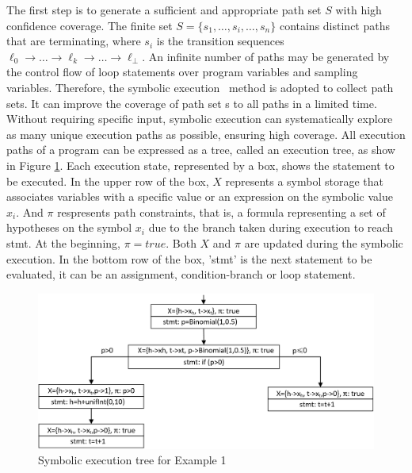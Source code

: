 \documentclass[runningheads]{llncs}
\begin{document}
The first step is to generate a sufficient and appropriate path set $S$ with high confidence coverage. The finite set $S=\{s_1,\dots,s_i,\dots,s_n\}$ contains distinct paths that are terminating, where $s_i$ is the transition sequences $\ell_0 \to \dots \to \ell_k \to \dots \to \ell_{\bot}$. An infinite number of paths may be generated by the control flow of loop statements over program variables and sampling variables. Therefore, the symbolic execution~\cite{Geldenhuys2012symbolic} method is adopted to collect path sets. It can improve the coverage of path set s to all paths in a limited time. Without requiring specific input, symbolic execution can systematically explore as many unique execution paths as possible, ensuring high coverage. All execution paths of a program can be expressed as a tree, called an execution tree, as show in Figure \ref{executionTree}. Each execution state, represented by a box, shows the statement to be executed. In the upper row of the box, $X$ represents a symbol storage that associates variables with a specific value or an expression on the symbolic value $x_i$. And $\pi$ respresents path constraints, that is, a formula representing a set of hypotheses on the symbol $x_i$ due to the branch taken during execution to reach stmt. At the beginning, $\pi=true$. Both $X$ and $\pi$ are updated during the symbolic execution. In the bottom row of the box, 'stmt' is the next statement to be evaluated, it can be an assignment, condition-branch or loop statement.

\begin{figure}[h]
	\centering
	\includegraphics[scale=0.6]{img/executionTree}
	\caption{Symbolic execution tree for Example 1}
	\label{executionTree}
\end{figure}
\end{document}
